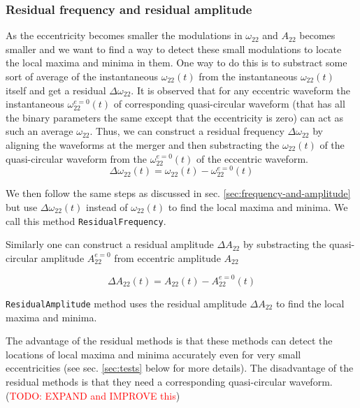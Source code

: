 \documentclass[aps,prd,amsmath,floats,floatfix, twocolumn,
superscriptaddress,nofootinbib,showpacs]{revtex4-1}
\newcommand{\red}{\textcolor{red}}
\newcommand{\TODO}[1]{\red{TODO: #1}}
\begin{document}
\subsubsection{Residual frequency and residual amplitude}
\label{sec:residual-frequency-and-residual-amplitude}
As the eccentricity becomes smaller the modulations in $\omega_{22}$
and $A_{22}$ becomes smaller and we want to find a way to detect these
small modulations to locate the local maxima and minima in them. One
way to do this is to substract some sort of average of the
instantaneous $\omega_{22}(t)$ from the instantaneous $\omega_{22}(t)$
itself and get a residual $\Delta\omega_{22}$. It is observed that for
any eccentric waveform the instantaneous $\omega_{22}^{e=0}(t)$ of
corresponding quasi-circular waveform (that has all the binary
parameters the same except that the eccentricity is zero) can act as
such an average $\omega_{22}$. Thus, we can construct a residual
frequency $\Delta\omega_{22}$ by aligning the waveforms at the merger
and then substracting the $\omega_{22}(t)$ of the quasi-circular
waveform from the $\omega_{22}^{e=0}(t)$ of the eccentric waveform.
\begin{equation}
  \label{eq:residual-omega22}
  \Delta\omega_{22}(t) = \omega_{22}(t) - \omega_{22}^{e=0}(t)
\end{equation}

We then follow the same steps as discussed in
sec. \ref{sec:frequency-and-amplitude} but use $\Delta\omega_{22}(t)$
instead of $\omega_{22}(t)$ to find the local maxima and minima. We
call this method \texttt{ResidualFrequency}.

Similarly one can construct a residual amplitude $\Delta A_{22}$ by
substracting the quasi-circular amplitude $A_{22}^{e=0}$ from
eccentric amplitude $A_{22}$

\begin{equation}
  \label{eq:residual-amplitude}
  \Delta A_{22}(t) = A_{22}(t) - A_{22}^{e=0}(t)
\end{equation}

\texttt{ResidualAmplitude} method uses the residual amplitude $\Delta
A_{22}$ to find the local maxima and minima.

The advantage of the residual methods is that these methods can detect
the locations of local maxima and minima accurately even for very
small eccentricities (see sec. \ref{sec:tests} below for more
details). The disadvantage of the residual methods is that they need a
corresponding quasi-circular waveform. (\TODO{EXPAND and IMPROVE this})
\end{document}
